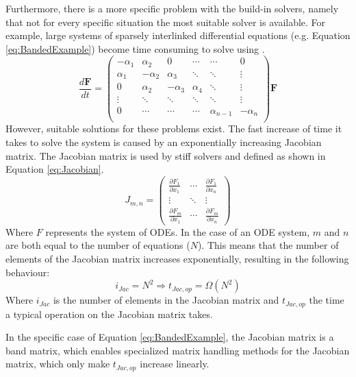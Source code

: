Furthermore, there is a more specific problem with the build-in \MATLAB solvers, namely that not for every specific situation the most suitable solver is available. For example, large systems of sparsely interlinked differential equations (e.g. Equation \ref{eq:BandedExample}) become time consuming to solve using \MATLAB.
\begin{equation} \label{eq:BandedExample}
  \frac{d\mathbf{F}}{dt} =
  \begin{pmatrix}
   -\alpha_1 & \alpha_2 & 0 & \cdots & \cdots & 0 \\
   \alpha_1 & -\alpha_2 & \alpha_3 & \ddots & \ddots & \vdots \\
   0 & \alpha_2 & -\alpha_3 & \alpha_4  & \ddots & \vdots \\
   \vdots & \ddots & \ddots & \ddots & \ddots & \vdots  \\
   0 & \cdots & \cdots & \cdots & \alpha_{n-1} & -\alpha_{n} \\
  \end{pmatrix}
  \mathbf{F}
\end{equation}
However, suitable solutions for these problems exist. The fast increase of time it takes to solve the system is caused by an exponentially increasing Jacobian matrix. The Jacobian matrix is used by stiff solvers and defined as shown in Equation \ref{eq:Jacobian}.
\begin{equation} \label{eq:Jacobian}
  J_{m,n} =
  \begin{pmatrix}
   \frac{\partial F_1}{\partial x_1} & \cdots & \frac{\partial F_1}{\partial x_n} \\
   \vdots & \ddots & \vdots  \\
   \frac{\partial F_m}{\partial x_1} & \cdots & \frac{\partial F_m}{\partial x_n}
  \end{pmatrix}
\end{equation}
Where $F$ represents the system of ODEs. In the case of an ODE system, $m$ and $n$ are both equal to the number of equations ($N$). This means that the number of elements of the Jacobian matrix increases exponentially, resulting in the following behaviour:
\begin{equation}
 i_{Jac} = N^2 \Rightarrow
 t_{Jac,op} = \Omega(N^2)
\end{equation}
Where $i_{Jac}$ is the number of elements in the Jacobian matrix and $t_{Jac,op}$ the time a typical operation on the Jacobian matrix takes.

In the specific case of Equation \ref{eq:BandedExample}, the Jacobian matrix is a band matrix, which enables specialized matrix handling methods for the Jacobian matrix, which only make $t_{Jac,op}$ increase linearly.

